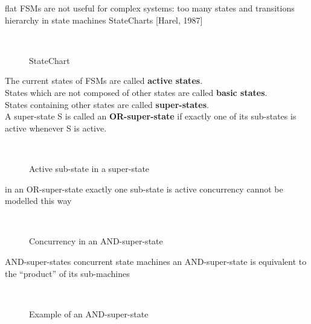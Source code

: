 \os{\newpage}
\bi
	\ite flat FSMs are not useful for complex systems: too many states and transitions
	\ite hierarchy in state machines \pr StateCharts [Harel, 1987]
\ei

\begin{figure}[!hbtp]
     \begin{center}
	  \\
	  \caption{StateChart}
     \end{center}
\end{figure}
\os{\newpage}

{The current states of FSMs are called \textbf{active states}.\\
States which are not composed of other states are called \textbf{basic
states}.\\
States containing other states are called \textbf{super-states}.\\
A super-state S is called an \textbf{OR-super-state} if exactly one of its
sub-states is active whenever S is active.}

\begin{figure}[!hbtp]
     \begin{center}
	  \\
	  \caption{Active sub-state in a super-state}
     \end{center}
\end{figure}

\os{\newpage}
\bi
	\ite in an OR-super-state exactly one sub-state is active
	\ite concurrency cannot be modelled this way
\ei


\begin{figure}[!hbtp]
     \begin{center}
	  \\
	  \caption{Concurrency in an AND-super-state}
     \end{center}
\end{figure}
\os{\newpage}

\bi
	\ite AND-super-states \pr concurrent state machines
	\ite an AND-super-state is equivalent to the ``product'' of its sub-machines
\ei

\begin{figure}[!hbtp]
     \begin{center}
	  \\
	  \caption{Example of an AND-super-state}
     \end{center}
\end{figure}

